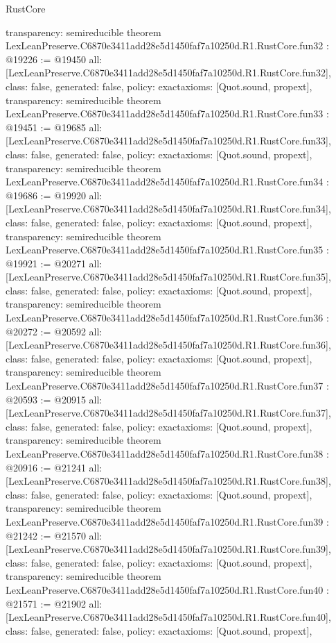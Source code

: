 \begin{lexlean}{RustCore}
\begin{coremodule}
{  transparency: semireducible
}
theorem LexLeanPreserve.C6870e3411add28e5d1450faf7a10250d.R1.RustCore.fun32 : @19226 := @19450 {
  all: [LexLeanPreserve.C6870e3411add28e5d1450faf7a10250d.R1.RustCore.fun32],
  class: false,
  generated: false,
  policy: exact{axioms: [Quot.sound, propext]},
  transparency: semireducible
}
theorem LexLeanPreserve.C6870e3411add28e5d1450faf7a10250d.R1.RustCore.fun33 : @19451 := @19685 {
  all: [LexLeanPreserve.C6870e3411add28e5d1450faf7a10250d.R1.RustCore.fun33],
  class: false,
  generated: false,
  policy: exact{axioms: [Quot.sound, propext]},
  transparency: semireducible
}
theorem LexLeanPreserve.C6870e3411add28e5d1450faf7a10250d.R1.RustCore.fun34 : @19686 := @19920 {
  all: [LexLeanPreserve.C6870e3411add28e5d1450faf7a10250d.R1.RustCore.fun34],
  class: false,
  generated: false,
  policy: exact{axioms: [Quot.sound, propext]},
  transparency: semireducible
}
theorem LexLeanPreserve.C6870e3411add28e5d1450faf7a10250d.R1.RustCore.fun35 : @19921 := @20271 {
  all: [LexLeanPreserve.C6870e3411add28e5d1450faf7a10250d.R1.RustCore.fun35],
  class: false,
  generated: false,
  policy: exact{axioms: [Quot.sound, propext]},
  transparency: semireducible
}
theorem LexLeanPreserve.C6870e3411add28e5d1450faf7a10250d.R1.RustCore.fun36 : @20272 := @20592 {
  all: [LexLeanPreserve.C6870e3411add28e5d1450faf7a10250d.R1.RustCore.fun36],
  class: false,
  generated: false,
  policy: exact{axioms: [Quot.sound, propext]},
  transparency: semireducible
}
theorem LexLeanPreserve.C6870e3411add28e5d1450faf7a10250d.R1.RustCore.fun37 : @20593 := @20915 {
  all: [LexLeanPreserve.C6870e3411add28e5d1450faf7a10250d.R1.RustCore.fun37],
  class: false,
  generated: false,
  policy: exact{axioms: [Quot.sound, propext]},
  transparency: semireducible
}
theorem LexLeanPreserve.C6870e3411add28e5d1450faf7a10250d.R1.RustCore.fun38 : @20916 := @21241 {
  all: [LexLeanPreserve.C6870e3411add28e5d1450faf7a10250d.R1.RustCore.fun38],
  class: false,
  generated: false,
  policy: exact{axioms: [Quot.sound, propext]},
  transparency: semireducible
}
theorem LexLeanPreserve.C6870e3411add28e5d1450faf7a10250d.R1.RustCore.fun39 : @21242 := @21570 {
  all: [LexLeanPreserve.C6870e3411add28e5d1450faf7a10250d.R1.RustCore.fun39],
  class: false,
  generated: false,
  policy: exact{axioms: [Quot.sound, propext]},
  transparency: semireducible
}
theorem LexLeanPreserve.C6870e3411add28e5d1450faf7a10250d.R1.RustCore.fun40 : @21571 := @21902 {
  all: [LexLeanPreserve.C6870e3411add28e5d1450faf7a10250d.R1.RustCore.fun40],
  class: false,
  generated: false,
  policy: exact{axioms: [Quot.sound, propext]},
}
\end{coremodule}
\end{lexlean}
